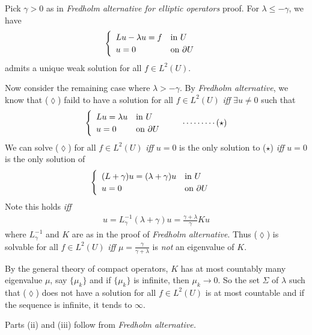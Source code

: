 \documentclass[12pt,a4paper]{report}
\newenvironment{proof}
{\begin{changemargin}{1cm}{0.5cm} 
	}%
	{\end{changemargin}
}
\begin{document}
\begin{proof}
\pf Pick $\gamma >0$ as in \emph{Fredholm alternative for elliptic operators} proof. For $\lambda \leq -\gamma$, we have
\begin{align*}
\begin{cases}
\begin{array}{ll}
Lu - \lambda u = f & \text{in } U \\
u =0  & \text{on } \partial U
\end{array}
\end{cases}
\end{align*}
admits a unique weak solution for all $f\in L^2(U)$.

\quad Now consider the remaining case where $\lambda > -\gamma$. By \emph{Fredholm alternative}, we know that ($\lozenge$) faild to have a solution for all $f\in L^2(U)$ \emph{iff} $\exists u \neq 0$ such that
\begin{align*}
\begin{cases}
\begin{array}{ll}
Lu = \lambda u  & \text{in } U \\
u = 0 & \text{on } \partial U
\end{array}
\end{cases} \quad  \cdots\cdots\cdots (\star)
\end{align*}
We can solve ($\lozenge$) for all $f \in L^2(U)$ \emph{iff} $u=0$ is the only solution to ($\star$) \emph{iff} $u=0$ is the only solution of 
\begin{align}
\begin{cases}
\begin{array}{ll}
(L+\gamma)u = (\lambda +\gamma) u  & \text{in } U\\
u = 0 & \text{on } \partial U
\end{array}
\end{cases}
\end{align}
Note this holds \emph{iff} 
\begin{align*}
u = L_{\gamma}^{-1} (\lambda + \gamma) u = \frac{\gamma+\lambda}{\gamma} Ku
\end{align*}
where $L_{\gamma}^{-1}$ and $K$ are as in the proof of \emph{Fredholm alternative}. Thus ($\lozenge$) is solvable for all $f\in L^2(U)$ \emph{iff} $\mu = \frac{\gamma}{\gamma + \lambda}$ is \emph{not} an eigenvalue of $K$.

\quad By the general theory of compact operators, $K$ has at most countably many eigenvalue $\mu$, say $\{\mu_k \}$ and if $\{ \mu_k \}$ is infinite, then $\mu_k \rightarrow 0$. So the set $\Sigma$ of $\lambda$ such that ($\lozenge$) does not have a solution for all $f\in L^2(U)$ is at most countable and if the sequence is infinite, it tends to $\infty$.
\s

Parts (ii) and (iii) follow from \emph{Fredholm alternative.}

\eop
\end{proof}
\s
\end{document}
